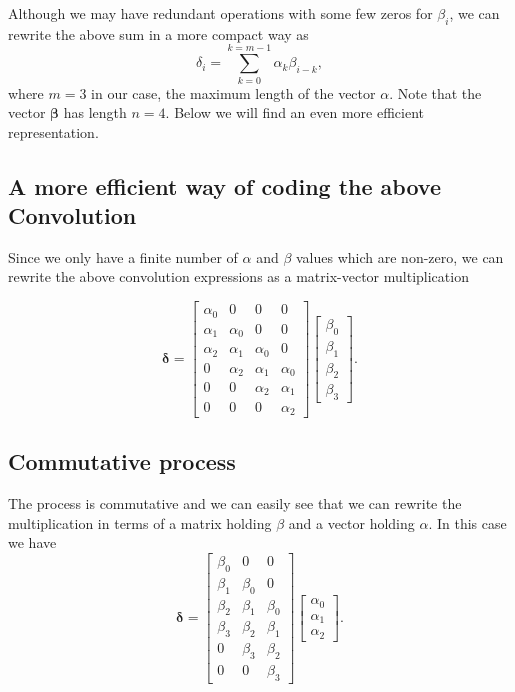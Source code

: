 \documentclass[%
oneside,                 %
final,                   %
10pt]{article}
\begin{document}
Although we may have redundant operations with some few zeros for $\beta_i$, we can rewrite the above sum in a more compact way as 
\[
\delta_i = \sum_{k=0}^{k=m-1}\alpha_k\beta_{i-k},
\]
where $m=3$ in our case, the maximum length of
the vector $\alpha$. Note that the vector $\bm{\beta}$ has length $n=4$. Below we will find an even more efficient representation.

\subsection{A more efficient way of coding the above Convolution}

Since we only have a finite number of $\alpha$ and $\beta$ values
which are non-zero, we can rewrite the above convolution expressions
as a matrix-vector multiplication

\[
\bm{\delta}=\begin{bmatrix}\alpha_0 & 0 & 0 & 0 \\
                            \alpha_1 & \alpha_0 & 0 & 0 \\
			    \alpha_2 & \alpha_1 & \alpha_0 & 0 \\
			    0 & \alpha_2 & \alpha_1 & \alpha_0 \\
			    0 & 0 & \alpha_2 & \alpha_1 \\
			    0 & 0 & 0 & \alpha_2
			    \end{bmatrix}\begin{bmatrix} \beta_0 \\ \beta_1 \\ \beta_2 \\ \beta_3\end{bmatrix}.
\]

\subsection{Commutative process}

The process is commutative and we can easily see that we can rewrite the multiplication in terms of  a matrix holding $\beta$ and a vector holding $\alpha$.
In this case we have
\[
\bm{\delta}=\begin{bmatrix}\beta_0 & 0 & 0  \\
                            \beta_1 & \beta_0 & 0  \\
			    \beta_2 & \beta_1 & \beta_0  \\
			    \beta_3 & \beta_2 & \beta_1 \\
			    0 & \beta_3 & \beta_2 \\
			    0 & 0 & \beta_3
			    \end{bmatrix}\begin{bmatrix} \alpha_0 \\ \alpha_1 \\ \alpha_2\end{bmatrix}.
\]
\end{document}
